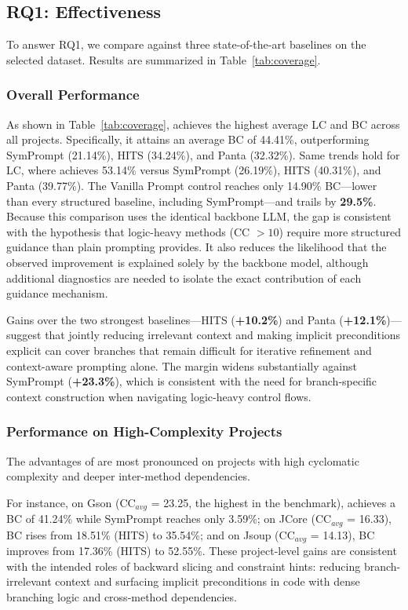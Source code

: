 

\subsection{RQ1: Effectiveness}
To answer RQ1, we compare \ourmethod{} against three state-of-the-art baselines on the selected dataset. Results are summarized in Table~\ref{tab:coverage}.
\subsubsection{Overall Performance}
As shown in Table~\ref{tab:coverage}, \ourmethod{} achieves the highest average LC and BC across all projects.
Specifically, it attains an average BC of 44.41\%, outperforming SymPrompt (21.14\%), HITS (34.24\%), and Panta (32.32\%).
Same trends hold for LC, where \ourmethod{} achieves 53.14\% versus SymPrompt (26.19\%), HITS (40.31\%), and Panta (39.77\%).
The Vanilla Prompt control reaches only 14.90\% BC---lower than every structured baseline, including SymPrompt---and trails \ourmethod{} by \textbf{29.5\%}.
Because this comparison uses the identical backbone LLM, the gap is consistent with the hypothesis that logic-heavy methods (CC $> 10$) require more structured guidance than plain prompting provides.
It also reduces the likelihood that the observed improvement is explained solely by the backbone model, although additional diagnostics are needed to isolate the exact contribution of each guidance mechanism.

Gains over the two strongest baselines---HITS (\textbf{+10.2\%}) and Panta (\textbf{+12.1\%})---suggest that jointly reducing irrelevant context and making implicit preconditions explicit can cover branches that remain difficult for iterative refinement and context-aware prompting alone.
The margin widens substantially against SymPrompt (\textbf{+23.3\%}), which is consistent with the need for branch-specific context construction when navigating logic-heavy control flows.

\subsubsection{Performance on High-Complexity Projects}
The advantages of \ourmethod{} are most pronounced on projects with high cyclomatic complexity and deeper inter-method dependencies. 

For instance, on Gson (CC$_{avg}$ = 23.25, the highest in the benchmark), \ourmethod{} achieves a BC of 41.24\% while SymPrompt reaches only 3.59\%; on JCore (CC$_{avg}$ = 16.33), BC rises from 18.51\% (HITS) to 35.54\%; and on Jsoup (CC$_{avg}$ = 14.13), BC improves from 17.36\% (HITS) to 52.55\%.
These project-level gains are consistent with the intended roles of backward slicing and constraint hints: reducing branch-irrelevant context and surfacing implicit preconditions in code with dense branching logic and cross-method dependencies.

